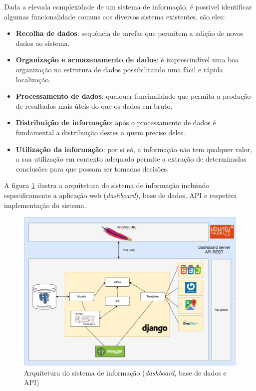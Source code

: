 Dada a elevada complexidade de um sistema de informação, é possivel identificar algumas funcionalidade comuns aos diversos sistema existentes, são eles\cite{Turban1996}: 

\begin{itemize}
	\item \textbf{Recolha de dados}: sequência de tarefas que permitem a adição de novos dados ao sistema.
	
	\item \textbf{Organização e armazenamento de dados}: é imprescindível uma boa organização na estrutura de dados possibilitando uma fácil e rápida localização.
	\item \textbf{Processamento de dados}: qualquer funcinalidade que permita a produção de resultados mais úteis do que os dados em bruto. 
	 
	\item \textbf{Distribuição de informação}: após o processamento de dados é fundamental a distribuição destes a quem precise deles.
	
	\item \textbf{Utilização da informação}: por si só, a informação não tem qualquer valor, a sua utilização em contexto adequado permite a extração de determinadas conclusões para que possam ser tomadas decisões.
	
\end{itemize}



A figura \ref{arquiteturasi} ilustra a arquitetura do sistema de informação incluindo especificamente a aplicação web (\textit{dashboard}), base de dados, \acs{API}   e respetiva implementação do sistema. 


\begin{figure}[h]
	\centering
	\includegraphics[width=\linewidth]{esquemas/fisica-si.pdf}
	\caption{Arquitetura do sistema de informação (\textit{dashboard}, base de dados e API)}
	\label{arquiteturasi}
\end{figure}



